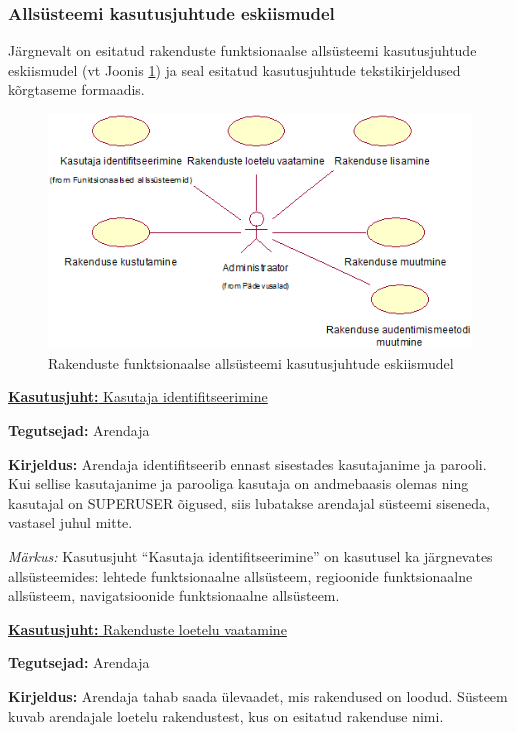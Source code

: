 \documentclass[a4paper,12pt]{article} %
\begin{document}
\subsubsection{Allsüsteemi kasutusjuhtude eskiismudel}
Järgnevalt on esitatud rakenduste funktsionaalse allsüsteemi kasutusjuhtude eskiismudel (vt Joonis \ref{fig_rakenduste_funktsionaalse_allsüsteemi_kasutusjuhtude_eskiismudel}) ja seal esitatud kasutusjuhtude tekstikirjeldused kõrgtaseme formaadis.
\begin{figure}[H]
\centering
\includegraphics[width=\textwidth]{./diagrams/applications-subsystem-use-case-digram.png}
\caption{Rakenduste funktsionaalse allsüsteemi kasutusjuhtude eskiismudel}
\label{fig_rakenduste_funktsionaalse_allsüsteemi_kasutusjuhtude_eskiismudel}
\end{figure}
\underline{\textbf{Kasutusjuht:} Kasutaja identifitseerimine}
\par
\textbf{Tegutsejad:} Arendaja
\par
\textbf{Kirjeldus:} Arendaja identifitseerib ennast sisestades kasutajanime ja parooli. Kui sellise kasutajanime ja parooliga kasutaja on andmebaasis olemas ning kasutajal on SUPERUSER õigused, siis lubatakse arendajal süsteemi siseneda, vastasel juhul mitte.
\par
\textit{Märkus:} Kasutusjuht  ``Kasutaja identifitseerimine'' on kasutusel ka järgnevates allsüsteemides: lehtede funktsionaalne allsüsteem, regioonide funktsionaalne allsüsteem, navigatsioonide funktsionaalne allsüsteem.\par

\underline{\textbf{Kasutusjuht:} Rakenduste loetelu vaatamine}
\par
\textbf{Tegutsejad:} Arendaja
\par
\textbf{Kirjeldus:} Arendaja tahab saada ülevaadet, mis rakendused on loodud. Süsteem kuvab arendajale loetelu rakendustest, kus on esitatud rakenduse nimi.
\par
\end{document}
